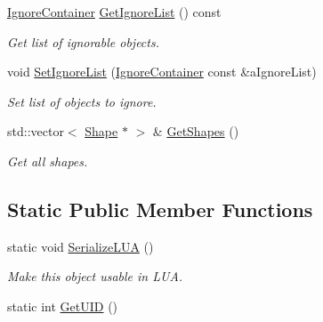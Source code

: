 \begin{DoxyCompactItemize}
\hyperlink{classPhysicsObject_a5ab17c11089e18df5c34651dbad8903a}{Ignore\+Container} \hyperlink{classPhysicsObject_ab1e13bde9854d4da86bc2831cc2804f0}{Get\+Ignore\+List} () const 
\begin{DoxyCompactList}\small\item\em Get list of ignorable objects. \end{DoxyCompactList}\item 
void \hyperlink{classPhysicsObject_a7836f03fa0341de1abfedd82bd62d128}{Set\+Ignore\+List} (\hyperlink{classPhysicsObject_a5ab17c11089e18df5c34651dbad8903a}{Ignore\+Container} const \&a\+Ignore\+List)
\begin{DoxyCompactList}\small\item\em Set list of objects to ignore. \end{DoxyCompactList}\item 
std\+::vector$<$ \hyperlink{structShape}{Shape} $\ast$ $>$ \& \hyperlink{classPhysicsObject_a9953e6d2a78302734c0e0b22543d4a4a}{Get\+Shapes} ()
\begin{DoxyCompactList}\small\item\em Get all shapes. \end{DoxyCompactList}\end{DoxyCompactItemize}
\subsection*{Static Public Member Functions}
\begin{DoxyCompactItemize}
\item 
static void \hyperlink{classPhysicsObject_a33873073fb457338962a359b1fa3553e}{Serialize\+L\+UA} ()
\begin{DoxyCompactList}\small\item\em Make this object usable in L\+UA. \end{DoxyCompactList}\item 
static int \hyperlink{classPhysicsObject_abde6a95513ac96a6057fff842365e365}{Get\+U\+ID} ()
\end{DoxyCompactItemize}
